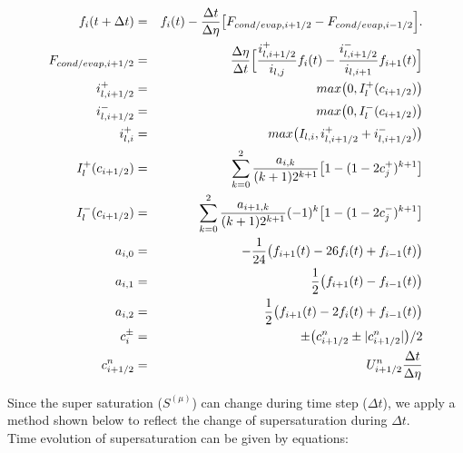 \begin{eqnarray}
f_{i}(t+\Delta t)&=&f_{i}(t)-\frac{\Delta t}{\Delta \eta}\bigl [F_{cond/evap,i+1/2}-F_{cond/evap,i-1/2}\Bigr ].\nonumber\\
F_{cond/evap,i+1/2}&=&\frac{\Delta \eta}{\Delta t}\Bigl[ \frac{i^{+}_{l,i+1/2}}{i_{l,j}}f_{i}(t)-\frac{i^{-}_{l,i+1/2}}{i_{l,i+1}}f_{i+1}(t)\Bigr ]\nonumber\\
i^{+}_{l,i+1/2}&=&max\bigl(0,I^{+}_{l}(c_{i+1/2})\bigr)\nonumber\\
i^{-}_{l,i+1/2}&=&max\bigl(0,I^{-}_{l}(c_{i+1/2})\bigr)\nonumber\\
i^{+}_{l,i}&=&max\bigl(I_{l,i},i^{+}_{l,i+1/2}+i^{-}_{l,i+1/2})\bigr)\nonumber\\
I^{+}_{l}(c_{i+1/2})&=&\sum_{k=0}^{2}\frac{a_{i,k}}{(k+1)2^{k+1}}\bigl[1-(1-2c^{+}_{j})^{k+1}\bigr]\nonumber\\
I^{-}_{l}(c_{i+1/2})&=&\sum_{k=0}^{2}\frac{a_{i+1,k}}{(k+1)2^{k+1}}(-1)^{k}\bigl[1-(1-2c^{-}_{j})^{k+1}\bigr]\nonumber\\
a_{i,0}&=&-\frac{1}{24}\bigl( f_{i+1}(t)-26f_{i}(t)+f_{i-1}(t) \bigr)\nonumber\\
a_{i,1}&=&\frac{1}{2}\bigl( f_{i+1}(t)-f_{i-1}(t) \bigr)\nonumber\\
a_{i,2}&=&\frac{1}{2}\bigl( f_{i+1}(t)-2f_{i}(t)+f_{i-1}(t) \bigr)\nonumber\\
c_{i}^{\pm}&=&\pm\bigl( c^{n}_{i+1/2}\pm | c^{n}_{i+1/2}|\bigr )/2\nonumber\\
c^{n}_{i+1/2}&=&U^{n}_{i+1/2}\frac{\Delta t}{\Delta \eta}
\end{eqnarray}

Since the super saturation ($S^{(\mu)}$) can change during time step ($\Delta t$), we apply a method shown below to reflect the change of supersaturation during $\Delta t$.\\
Time evolution of supersaturation can be given by equations: 

